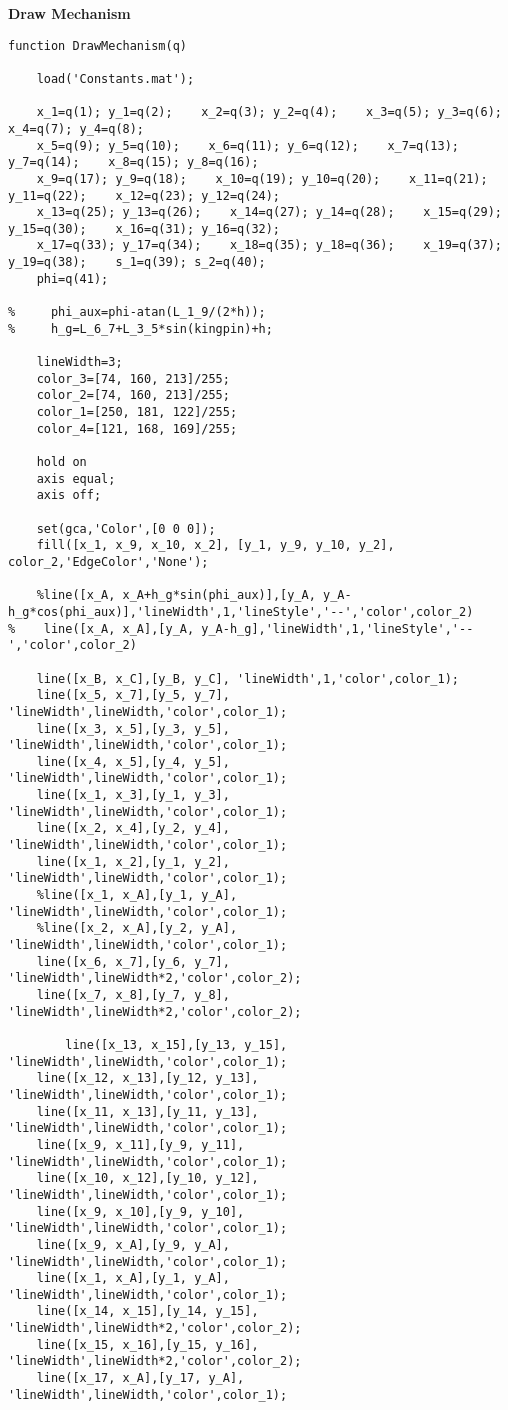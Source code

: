 \textbf{Draw Mechanism}
\begin{lstlisting}[style=codematlab]
function DrawMechanism(q) 
    
    load('Constants.mat');

    x_1=q(1); y_1=q(2);    x_2=q(3); y_2=q(4);    x_3=q(5); y_3=q(6);    x_4=q(7); y_4=q(8);
    x_5=q(9); y_5=q(10);    x_6=q(11); y_6=q(12);    x_7=q(13); y_7=q(14);    x_8=q(15); y_8=q(16);
    x_9=q(17); y_9=q(18);    x_10=q(19); y_10=q(20);    x_11=q(21); y_11=q(22);    x_12=q(23); y_12=q(24);
    x_13=q(25); y_13=q(26);    x_14=q(27); y_14=q(28);    x_15=q(29); y_15=q(30);    x_16=q(31); y_16=q(32);
    x_17=q(33); y_17=q(34);    x_18=q(35); y_18=q(36);    x_19=q(37); y_19=q(38);    s_1=q(39); s_2=q(40); 
    phi=q(41);
    
%     phi_aux=phi-atan(L_1_9/(2*h));
%     h_g=L_6_7+L_3_5*sin(kingpin)+h;
    
    lineWidth=3;
    color_3=[74, 160, 213]/255;
    color_2=[74, 160, 213]/255;
    color_1=[250, 181, 122]/255;
    color_4=[121, 168, 169]/255;
    
    hold on
    axis equal;         
    axis off;
    
    set(gca,'Color',[0 0 0]);
    fill([x_1, x_9, x_10, x_2], [y_1, y_9, y_10, y_2], color_2,'EdgeColor','None');
    
    %line([x_A, x_A+h_g*sin(phi_aux)],[y_A, y_A-h_g*cos(phi_aux)],'lineWidth',1,'lineStyle','--','color',color_2)
%    line([x_A, x_A],[y_A, y_A-h_g],'lineWidth',1,'lineStyle','--','color',color_2)
    
    line([x_B, x_C],[y_B, y_C], 'lineWidth',1,'color',color_1);
    line([x_5, x_7],[y_5, y_7], 'lineWidth',lineWidth,'color',color_1);
    line([x_3, x_5],[y_3, y_5], 'lineWidth',lineWidth,'color',color_1);
    line([x_4, x_5],[y_4, y_5], 'lineWidth',lineWidth,'color',color_1);
    line([x_1, x_3],[y_1, y_3], 'lineWidth',lineWidth,'color',color_1);
    line([x_2, x_4],[y_2, y_4], 'lineWidth',lineWidth,'color',color_1);
    line([x_1, x_2],[y_1, y_2], 'lineWidth',lineWidth,'color',color_1);
    %line([x_1, x_A],[y_1, y_A], 'lineWidth',lineWidth,'color',color_1);
    %line([x_2, x_A],[y_2, y_A], 'lineWidth',lineWidth,'color',color_1);
    line([x_6, x_7],[y_6, y_7], 'lineWidth',lineWidth*2,'color',color_2);
    line([x_7, x_8],[y_7, y_8], 'lineWidth',lineWidth*2,'color',color_2);
    
        line([x_13, x_15],[y_13, y_15], 'lineWidth',lineWidth,'color',color_1);
    line([x_12, x_13],[y_12, y_13], 'lineWidth',lineWidth,'color',color_1);
    line([x_11, x_13],[y_11, y_13], 'lineWidth',lineWidth,'color',color_1);
    line([x_9, x_11],[y_9, y_11], 'lineWidth',lineWidth,'color',color_1);
    line([x_10, x_12],[y_10, y_12], 'lineWidth',lineWidth,'color',color_1);
    line([x_9, x_10],[y_9, y_10], 'lineWidth',lineWidth,'color',color_1);
    line([x_9, x_A],[y_9, y_A], 'lineWidth',lineWidth,'color',color_1);
    line([x_1, x_A],[y_1, y_A], 'lineWidth',lineWidth,'color',color_1);
    line([x_14, x_15],[y_14, y_15], 'lineWidth',lineWidth*2,'color',color_2);
    line([x_15, x_16],[y_15, y_16], 'lineWidth',lineWidth*2,'color',color_2);
    line([x_17, x_A],[y_17, y_A], 'lineWidth',lineWidth,'color',color_1);


\end{lstlisting}
